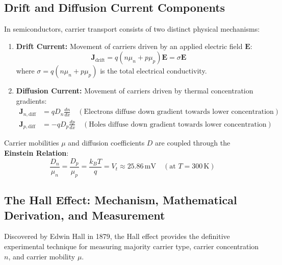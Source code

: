 \subsection{Drift and Diffusion Current Components}
In semiconductors, carrier transport consists of two distinct physical mechanisms:
\begin{enumerate}
    \item \textbf{Drift Current:} Movement of carriers driven by an applied electric field $\mathbf{E}$:
    \begin{equation}
        \mathbf{J}_{\text{drift}} = q(n\mu_n + p\mu_p)\mathbf{E} = \sigma \mathbf{E}
    \end{equation}
    where $\sigma = q(n\mu_n + p\mu_p)$ is the total electrical conductivity.
    \item \textbf{Diffusion Current:} Movement of carriers driven by thermal concentration gradients:
    \begin{align}
        \mathbf{J}_{n,\text{diff}} &= q D_n \frac{dn}{dx} \quad (\text{Electrons diffuse down gradient towards lower concentration}) \\
        \mathbf{J}_{p,\text{diff}} &= -q D_p \frac{dp}{dx} \quad (\text{Holes diffuse down gradient towards lower concentration})
    \end{align}
\end{enumerate}
Carrier mobilities $\mu$ and diffusion coefficients $D$ are coupled through the \textbf{Einstein Relation}:
\begin{equation}
    \frac{D_n}{\mu_n} = \frac{D_p}{\mu_p} = \frac{k_B T}{q} = V_t \approx 25.86\,\text{mV} \quad (\text{at } T = 300\,\text{K})
\end{equation}

\subsection{The Hall Effect: Mechanism, Mathematical Derivation, and Measurement}
Discovered by Edwin Hall in 1879, the Hall effect provides the definitive experimental technique for measuring majority carrier type, carrier concentration $n$, and carrier mobility $\mu$.

